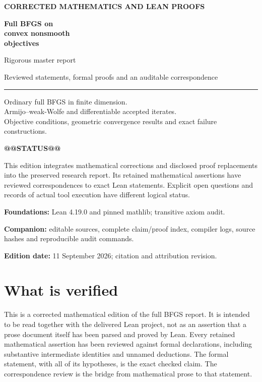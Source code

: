 \begin{titlepage}
\color{Ink}
{\large\sffamily\bfseries CORRECTED MATHEMATICS AND LEAN PROOFS}\par
\vspace{19mm}
{\Huge\bfseries Full BFGS on\\[3mm]convex nonsmooth\\[3mm]objectives}\par
\vspace{11mm}
{\Large Rigorous master report}\par
\vspace{6mm}
{\large Reviewed statements, formal proofs and an auditable correspondence}\par
\vspace{9mm}
{\color{Accent}\rule{\textwidth}{1.2pt}}\par
\vspace{6mm}
\begin{minipage}{.94\textwidth}
\large
Ordinary full BFGS in finite dimension.\\
Armijo--weak-Wolfe and differentiable accepted iterates.\\
Objective conditions, geometric convergence results and exact failure constructions.
\end{minipage}
\vfill
\begin{minipage}{.94\textwidth}
\textbf{@@STATUS@@}\par
\vspace{4mm}
This edition integrates mathematical corrections and disclosed proof replacements into the preserved research report. Its retained mathematical assertions have reviewed correspondences to exact Lean statements. Explicit open questions and records of actual tool execution have different logical status.\par
\vspace{4mm}
\textbf{Foundations:} Lean 4.19.0 and pinned mathlib; transitive axiom audit.\par
\textbf{Companion:} editable sources, complete claim/proof index, compiler logs, source hashes and reproducible audit commands.\par
\textbf{Edition date:} 11 September 2026; citation and attribution revision.
\end{minipage}
\end{titlepage}
\frontmatter
\chapter*{What is verified}
This is a corrected mathematical edition of the full BFGS report. It is intended to be read together with the delivered Lean project, not as an assertion that a prose document itself has been parsed and proved by Lean. Every retained mathematical assertion has been reviewed against formal declarations, including substantive intermediate identities and unnamed deductions. The formal statement, with all of its hypotheses, is the exact checked claim. The correspondence review is the bridge from mathematical prose to that statement.

